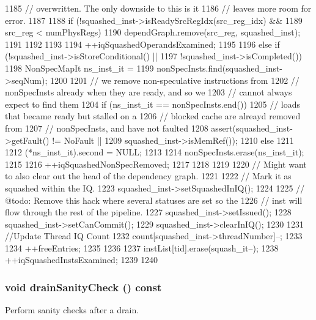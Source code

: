 \begin{DoxyCode}
{{{{{1185                     // overwritten.  The only downside to this is it
1186                     // leaves more room for error.
1187 
1188                     if (!squashed_inst->isReadySrcRegIdx(src_reg_idx) &&
1189                         src_reg < numPhysRegs) {
1190                         dependGraph.remove(src_reg, squashed_inst);
1191                     }
1192 
1193 
1194                     ++iqSquashedOperandsExamined;
1195                 }
1196             } else if (!squashed_inst->isStoreConditional() ||
1197                        !squashed_inst->isCompleted()) {
1198                 NonSpecMapIt ns_inst_it =
1199                     nonSpecInsts.find(squashed_inst->seqNum);
1200 
1201                 // we remove non-speculative instructions from
1202                 // nonSpecInsts already when they are ready, and so we
1203                 // cannot always expect to find them
1204                 if (ns_inst_it == nonSpecInsts.end()) {
1205                     // loads that became ready but stalled on a
1206                     // blocked cache are alreayd removed from
1207                     // nonSpecInsts, and have not faulted
1208                     assert(squashed_inst->getFault() != NoFault ||
1209                            squashed_inst->isMemRef());
1210                 } else {
1211 
1212                     (*ns_inst_it).second = NULL;
1213 
1214                     nonSpecInsts.erase(ns_inst_it);
1215 
1216                     ++iqSquashedNonSpecRemoved;
1217                 }
1218             }
1219 
1220             // Might want to also clear out the head of the dependency graph.
1221 
1222             // Mark it as squashed within the IQ.
1223             squashed_inst->setSquashedInIQ();
1224 
1225             // @todo: Remove this hack where several statuses are set so the
1226             // inst will flow through the rest of the pipeline.
1227             squashed_inst->setIssued();
1228             squashed_inst->setCanCommit();
1229             squashed_inst->clearInIQ();
1230 
1231             //Update Thread IQ Count
1232             count[squashed_inst->threadNumber]--;
1233 
1234             ++freeEntries;
1235         }
1236 
1237         instList[tid].erase(squash_it--);
1238         ++iqSquashedInstsExamined;
1239     }
1240 }
\end{DoxyCode}
\hypertarget{classInstructionQueue_a0240eb42fa57fe5d3788093f62b77347}{
\subsubsection[{drainSanityCheck}]{\setlength{\rightskip}{0pt plus 5cm}void drainSanityCheck () const}}
\label{classInstructionQueue_a0240eb42fa57fe5d3788093f62b77347}
Perform sanity checks after a drain. 


